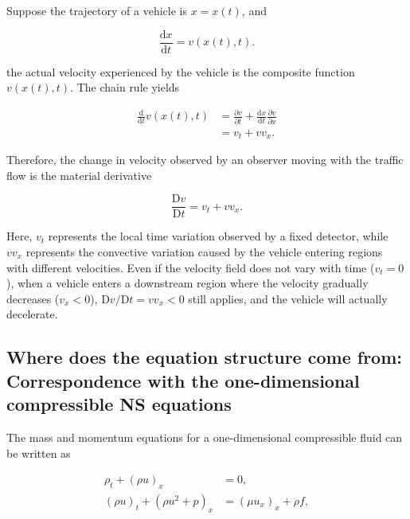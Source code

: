 \documentclass[11pt,a4paper,openany]{book}
\numberwithin{equation}{chapter}
\numberwithin{figure}{chapter}
\numberwithin{table}{chapter}
\begin{document}
Suppose the trajectory of a vehicle is $x=x(t)$, and

\begin{equation}
\frac{\mathrm dx}{\mathrm dt}=v(x(t),t).
\end{equation}

the actual velocity experienced by the vehicle is the composite function $v(x(t),t)$. The chain rule yields

\begin{align}
\frac{\mathrm d}{\mathrm dt}v(x(t),t)
&=\frac{\partial v}{\partial t}
+\frac{\mathrm dx}{\mathrm dt}\frac{\partial v}{\partial x}\\
&=v_t+vv_x.
\end{align}

Therefore, the change in velocity observed by an observer moving with the traffic flow is the material derivative

\begin{equation}
\frac{\mathrm Dv}{\mathrm Dt}=v_t+vv_x.
\label{eq:material-derivative}
\end{equation}

Here, $v_t$ represents the local time variation observed by a fixed detector, while $vv_x$ represents the convective variation caused by the vehicle entering regions with different velocities. Even if the velocity field does not vary with time ($v_t=0$), when a vehicle enters a downstream region where the velocity gradually decreases ($v_x<0$), $\mathrm Dv/\mathrm Dt=vv_x<0$ still applies, and the vehicle will actually decelerate.










\subsection{Where does the equation structure come from: Correspondence with the one-dimensional compressible NS equations}










The mass and momentum equations for a one-dimensional compressible fluid can be written as


\begin{subequations}
\label{eq:ns-analogy}
\begin{align}
\rho_t+(\rho u)_x&=0,\\
(\rho u)_t+(\rho u^2+p)_x
&=(\mu u_x)_x+\rho f,
\end{align}
\end{subequations}
\end{document}
